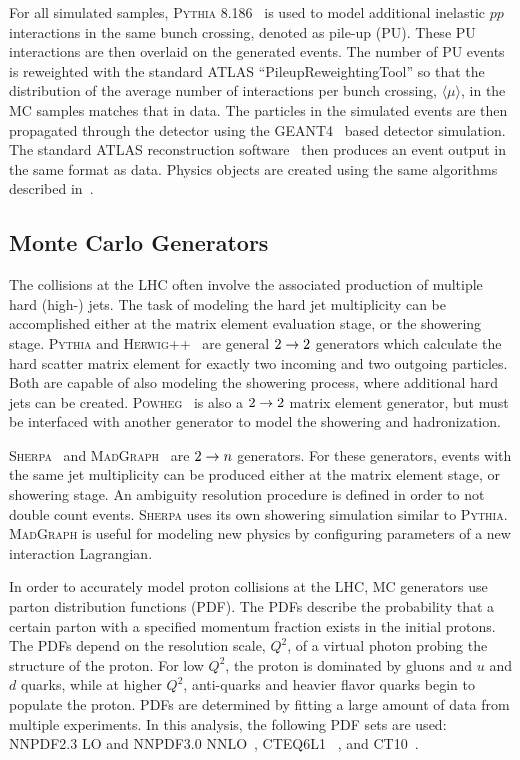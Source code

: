 For all simulated samples, \textsc{Pythia} 8.186~\cite{pythia8} is used to model additional inelastic $pp$ interactions in the same bunch crossing, denoted as pile-up (PU). These PU interactions are then overlaid on the generated events. The number of PU events is reweighted with the standard ATLAS ``PileupReweightingTool'' so that the distribution of the average number of interactions per bunch crossing, $\langle\mu\rangle$, in the MC samples matches that in data. The particles in the simulated events are then propagated through the detector using the \textsc{GEANT4}~\cite{geant4} based detector simulation. The standard ATLAS reconstruction software~\cite{atlas_sim} then produces an event output in the same format as data. Physics objects are created using the same algorithms described in~\Ch{\ref{ch:objreco}}.

%
\subsection{Monte Carlo Generators}
The collisions at the LHC often involve the associated production of multiple hard (high-\pT) jets. The task of modeling the hard jet multiplicity can be accomplished either at the matrix element evaluation stage, or the showering stage. \textsc{Pythia} and \textsc{Herwig++}~\cite{herwig} are general $2\rightarrow2$ generators which calculate the hard scatter matrix element for exactly two incoming and two outgoing particles. Both are capable of also modeling the showering process, where additional hard jets can be created. \textsc{Powheg}~\cite{powheg, powhegbox} is also a $2\rightarrow2$ matrix element generator, but must be interfaced with another generator to model the showering and hadronization. 

\textsc{Sherpa}~\cite{sherpa} and \textsc{MadGraph}~\cite{mg5_anlo} are $2\rightarrow n$ generators. For these generators, events with the same jet multiplicity can be produced either at the matrix element stage, or showering stage. An ambiguity resolution procedure is defined in order to not double count events.  \textsc{Sherpa} uses its own showering simulation similar to \textsc{Pythia}.  \textsc{MadGraph} is useful for modeling new physics by configuring parameters of a new interaction Lagrangian.

In order to accurately model proton collisions at the LHC, MC generators use parton distribution functions (PDF). The PDFs describe the probability that a certain parton with a specified momentum fraction exists in the initial protons. The PDFs depend on the resolution scale, $Q^2$, of a virtual photon probing the structure of the proton. For low $Q^2$, the proton is dominated by gluons and $u$ and $d$ quarks, while at higher $Q^2$, anti-quarks and heavier flavor quarks begin to populate the proton. PDFs are determined by fitting a large amount of data from multiple experiments. In this analysis, the following PDF sets are used: \textsc{NNPDF2.3} LO and \textsc{NNPDF3.0} NNLO~\cite{nnpdf}, \textsc{CTEQ6L1} ~\cite{cteq6l}, and \textsc{CT10}~\cite{ct10}.

